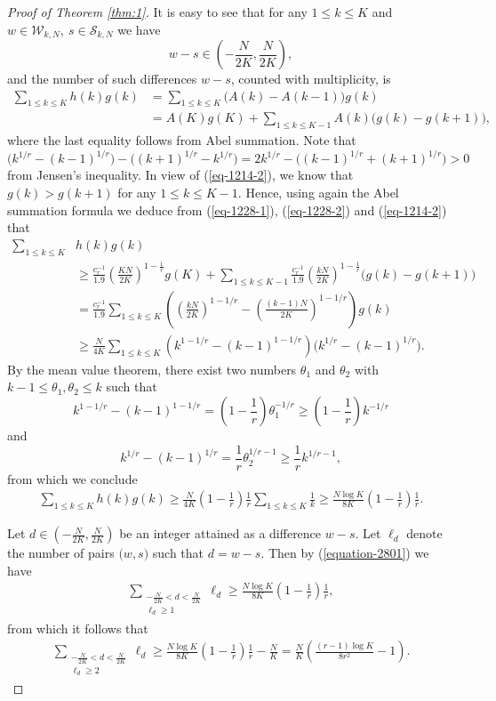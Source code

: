 \documentclass[12pt,a4paper,reqno]{amsart}
\numberwithin{equation}{section}
\theoremstyle{plain}
\theoremstyle{definition}
\begin{document}
\begin{proof}[Proof of Theorem \ref{thm:1}]
It is easy to see that for any $1\le k\le K$ and $w\in \mathscr{W}_{k,N},\ s\in \mathscr{S}_{k,N}$ we have
$$
w-s\in \left(-\frac{N}{2K}, \frac{N}{2K}\right),
$$
and the number of such differences $w-s$, counted with multiplicity, is
\begin{align}\label{eq-1228-2}
\sum_{1\le k\le K}h(k)g(k)&=\sum_{1\le k\le K}\Big(A(k)-A(k-1)\Big)g(k)\nonumber\\
&=A(K)g(K)+\sum_{1\le k\le K-1}A(k)\Big(g(k)-g(k+1)\Big),
\end{align}
where the last equality follows from Abel summation. Note that
$$
\Big(k^{1/r}-(k-1)^{1/r}\Big)-\Big((k+1)^{1/r}-k^{1/r}\Big)=2k^{1/r}-\Big((k-1)^{1/r}+(k+1)^{1/r}\Big)>0
$$
from Jensen's inequality. In view of (\ref{eq-1214-2}), we know that $g(k)>g(k+1)$ for any $1\le k\le K-1$. Hence, using again the Abel summation formula we deduce from (\ref{eq-1228-1}), (\ref{eq-1228-2}) and (\ref{eq-1214-2}) that
\begin{align*}
\sum_{1\le k\le K}&h(k)g(k)\nonumber\\
&\ge \frac{c_r^{-1}}{1.9}\left(\frac{KN}{2K}\right)^{1-\frac{1}{r}}g(K)+\sum_{1\le k\le K-1}\frac{c_r^{-1}}{1.9}\left(\frac{kN}{2K}\right)^{1-\frac{1}{r}}\Big(g(k)-g(k+1)\Big)\nonumber\\
&=\frac{c_r^{-1}}{1.9}\sum_{1\le k\le K}\left(\left(\frac{kN}{2K}\right)^{1-1/r}-\left(\frac{(k-1)N}{2K}\right)^{1-1/r}\right)g(k)\nonumber\\
&\ge \frac{N}{4K}\sum_{1\le k\le K}\left(k^{1-1/r}-\left(k-1\right)^{1-1/r}\right)\Big(k^{1/r}-(k-1)^{1/r}\Big).
\end{align*}
By the mean value theorem, there exist two numbers $\theta_1$ and $\theta_2$ with $k-1\le \theta_1, \theta_2\le k$ such that
$$
k^{1-1/r}-\left(k-1\right)^{1-1/r}=\left(1-\frac{1}{r}\right)\theta_1^{-1/r}\ge \left(1-\frac{1}{r}\right)k^{-1/r}
$$
and
$$
k^{1/r}-(k-1)^{1/r}=\frac{1}{r}\theta_2^{1/r-1}\ge \frac{1}{r}k^{1/r-1},
$$
from which we conclude
\begin{align}\label{equation-2801}
\sum_{1\le k\le K}h(k)g(k)\ge \frac{N}{4K}\left(1-\frac{1}{r}\right)\frac{1}{r}\sum_{1\le k\le K}\frac{1}{k}\ge \frac{N\log K}{8K}\left(1-\frac{1}{r}\right)\frac{1}{r}.
\end{align}

Let $d\in \left(-\frac{N}{2K}, \frac{N}{2K}\right)$ be an integer attained as a difference $w-s$. Let $\ell_d$ denote the number of pairs $\big(w,s\big)$ such that $d=w-s$. Then by (\ref{equation-2801}) we have
\begin{align*}
\sum_{\substack{-\frac{N}{2K}<d<\frac{N}{2K}\\ \ell_d\ge 1}}\ell_d\ge \frac{N\log K}{8K}\left(1-\frac{1}{r}\right)\frac{1}{r},
\end{align*}
from which it follows that
\begin{align}\label{eq-1214-5}
\sum_{\substack{-\frac{N}{2K}<d<\frac{N}{2K}\\ \ell_d\ge 2}}\ell_d\ge\frac{N\log K}{8K}\left(1-\frac{1}{r}\right)\frac{1}{r}-\frac{N}{K}=\frac{N}{K}\left(\frac{(r-1)\log K}{8r^2}-1\right).
\end{align}


\end{proof}
\end{document}
